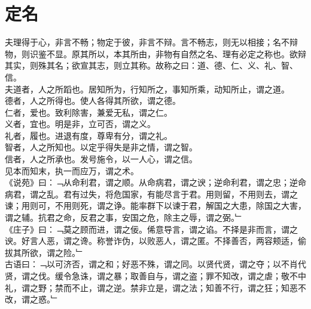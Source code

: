 \chapter{定名}%
夫理得于心，非言不畅；物定于彼，非言不辩。言不畅志，则无以相接；名不辩物，则识鉴不显。原其所以，本其所由，非物有自然之名、理有必定之称也。欲辩其实，则殊其名；欲宣其志，则立其称。故称之曰：道、德、仁、义、礼、智、信。\\
夫道者，人之所蹈也。居知所为，行知所之，事知所乘，动知所止，谓之道。\\
德者，人之所得也。使人各得其所欲，谓之德。\\
仁者，爱也。致利除害，兼爱无私，谓之仁。\\
义者，宜也。明是非，立可否，谓之义。\\
礼者，履也。进退有度，尊卑有分，谓之礼。\\
智者，人之所知也。以定乎得失是非之情，谓之智。\\
信者，人之所承也。发号施令，以一人心，谓之信。\\
见本而知末，执一而应万，谓之术。\\
《说苑》曰：﹁从命利君，谓之顺。从命病君，谓之谀；逆命利君，谓之忠；逆命病君，谓之乱。君有过失，将危国家，有能尽言于君。用则留，不用则去，谓之谏；用则可，不用则死，谓之诤。能率群下以谏于君，解国之大患，除国之大害，谓之辅。抗君之命，反君之事，安国之危，除主之辱，谓之弼。﹂\\
《庄子》曰：﹁莫之顾而进，谓之佞。俙意导言，谓之谄。不择是非而言，谓之谀。好言人恶，谓之谗。称誉诈伪，以败恶人，谓之匿。不择善否，两容颊适，偷拔其所欲，谓之险。﹂\\
古语曰：﹁以可济否，谓之和；好恶不殊，谓之同。以贤代贤，谓之夺；以不肖代贤，谓之伐。缓令急诛，谓之暴；取善自与，谓之盗；罪不知改，谓之虐；敬不中礼，谓之野；禁而不止，谓之逆。禁非立是，谓之法；知善不行，谓之狂；知恶不改，谓之惑。﹂\\
